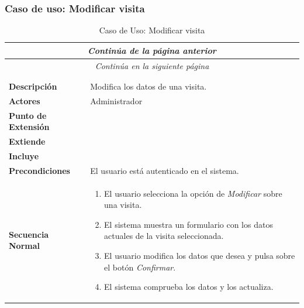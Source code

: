 \subsubsection*{Caso de uso: Modificar visita }
\begin{longtable}{| p{4cm} | p{10cm} |}
\endfirsthead
\multicolumn{2}{c}{\textit{Continúa de la página anterior}}\\[12pt]
\hline
\endhead
\hline
\multicolumn{2}{c}{\textit{Continúa en la siguiente página}} \\
\endfoot
\hline
\caption{Caso de Uso: Modificar visita}\label{fig:1}\\
\endlastfoot


\hline
\multicolumn{2}{|c|}{\textbf{CU$<$33$>$ - Modificar Visita}} \\

\hline
\textbf{Descripción} &
Modifica los datos de una visita.\\

\hline
\textbf{Actores} &
Administrador\\

\hline
\textbf{Punto de Extensión} &
\\

\hline
\textbf{Extiende} &
\\

\hline
\textbf{Incluye} &
\\

\hline
\textbf{Precondiciones} &
El usuario está autenticado en el sistema.\\

\hline
\textbf{Secuencia Normal} &\mbox{}\par\vspace{-\baselineskip}
\begin{enumerate}[leftmargin=0.7cm, topsep=0.1cm]
\item El usuario selecciona la opción de \textit{Modificar} sobre una visita.
\item El sistema muestra un formulario con los datos actuales de la visita seleccionada.
\item El usuario modifica los datos que desea y pulsa sobre el botón \textit{Confirmar}.
\item El sistema comprueba los datos y los actualiza.
\end{enumerate}



\end{longtable}
